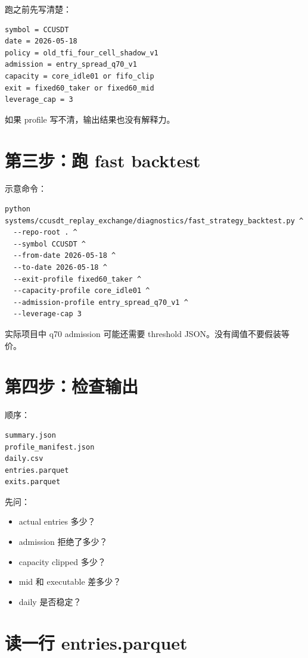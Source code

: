 跑之前先写清楚：

\begin{lstlisting}
symbol = CCUSDT
date = 2026-05-18
policy = old_tfi_four_cell_shadow_v1
admission = entry_spread_q70_v1
capacity = core_idle01 or fifo_clip
exit = fixed60_taker or fixed60_mid
leverage_cap = 3
\end{lstlisting}

如果 profile 写不清，输出结果也没有解释力。

\section{第三步：跑 fast backtest}

示意命令：

\begin{lstlisting}
python systems/ccusdt_replay_exchange/diagnostics/fast_strategy_backtest.py ^
  --repo-root . ^
  --symbol CCUSDT ^
  --from-date 2026-05-18 ^
  --to-date 2026-05-18 ^
  --exit-profile fixed60_taker ^
  --capacity-profile core_idle01 ^
  --admission-profile entry_spread_q70_v1 ^
  --leverage-cap 3
\end{lstlisting}

实际项目中 q70 admission 可能还需要 threshold JSON。没有阈值不要假装等价。

\section{第四步：检查输出}

顺序：

\begin{lstlisting}
summary.json
profile_manifest.json
daily.csv
entries.parquet
exits.parquet
\end{lstlisting}

先问：

\begin{itemize}[leftmargin=2em]
  \item actual entries 多少？
  \item admission 拒绝了多少？
  \item capacity clipped 多少？
  \item mid 和 executable 差多少？
  \item daily 是否稳定？
\end{itemize}

\section{读一行 entries.parquet}

